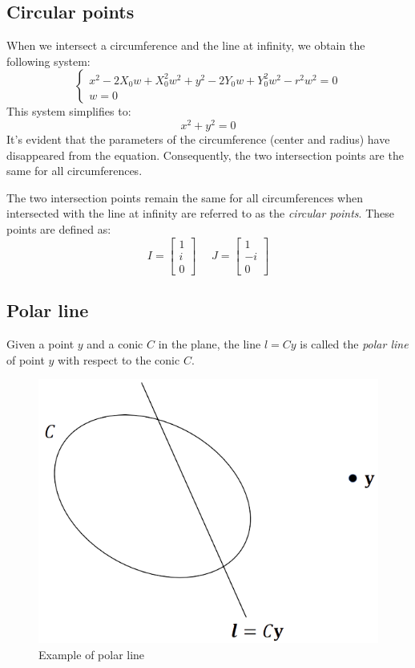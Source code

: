 \documentclass[12pt, a4paper]{report}
\begin{document}
    \subsection{Circular points}
    \begin{example}
        When we intersect a circumference and the line at infinity, we obtain the following system:
        \[\begin{cases}
            x^2-2X_0w+X_0^2w^2+y^2-2Y_0w+Y_0^2w^2-r^2w^2=0 \\
            w=0
        \end{cases}\]
        This system simplifies to: 
        \[x^2+y^2=0\]
        It's evident that the parameters of the circumference (center and radius) have disappeared from the equation. 
        Consequently, the two intersection points are the same for all circumferences.    
    \end{example}
    \newpage
    \begin{definition}
        The two intersection points remain the same for all circumferences when intersected with the line at infinity are referred to as the \emph{circular points}.
        These points are defined as:
        \[I=\begin{bmatrix} 1 \\ i \\ 0 \end{bmatrix} \:\:\:\:\:\: J=\begin{bmatrix} 1 \\ -i \\ 0 \end{bmatrix}\]
    \end{definition}

    \subsection{Polar line}
    \begin{definition}
        Given a point $y$ and a conic $C$ in the plane, the line $l=Cy$ is called the \emph{polar line} of point $y$ with respect to the conic $C$. 
    \end{definition}
    \begin{figure}[H]
        \centering
        \includegraphics[width=0.3\linewidth]{images/polar.png}
        \caption{Example of polar line}
    \end{figure}
    
\end{document}
